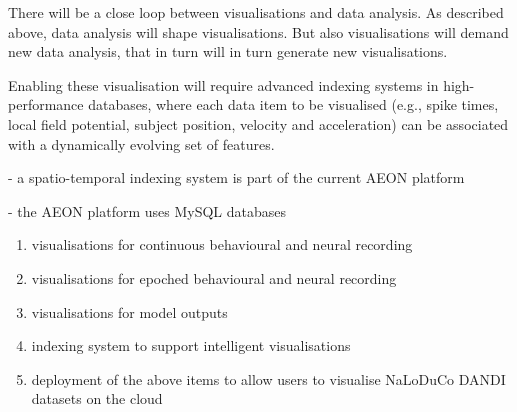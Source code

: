 There will be a close loop between visualisations and data analysis. As
described above, data analysis will shape visualisations. But also
visualisations will demand new data analysis, that in turn will in turn
generate new visualisations.

Enabling these visualisation will require advanced indexing systems in
high-performance databases, where each
data item to be visualised (e.g., spike times, local field potential, subject
position, velocity and acceleration) can be associated with a dynamically
evolving set of features.


- a spatio-temporal indexing system is part of the current AEON platform

- the AEON platform uses MySQL databases


\begin{enumerate}

    \item visualisations for continuous behavioural and neural recording

    \item visualisations for epoched behavioural and neural recording

    \item visualisations for model outputs

    \item indexing system to support intelligent visualisations

    \item deployment of the above items to allow users to visualise NaLoDuCo
        DANDI datasets on the cloud

\end{enumerate}
